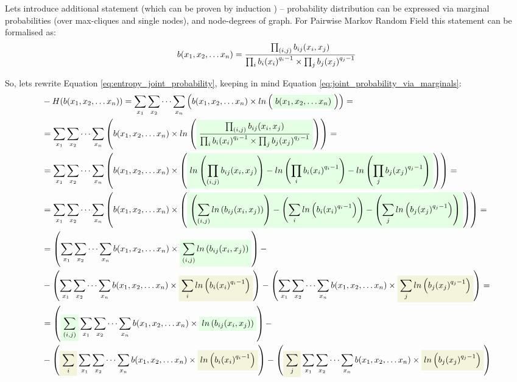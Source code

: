 \documentclass[fleqn,leqno]{article}
\newcommand{\highlight}[1]{\colorbox{green!10}{$\displaystyle#1$}}
\newcommand{\highlightred}[1]{\colorbox{olive!10}{$\displaystyle#1$}}
\begin{document}
Lets introduce additional statement \cite{bethe_free_energy_kikuch_approximations_and_bp} (which can be proven by induction \cite{a_montanari_inference_in_graphical_models}) -- probability distribution can be expressed via marginal probabilities (over max-cliques and single nodes), and node-degrees of graph. For Pairwise Markov Random Field this statement can be formalised as:
\begin{equation} \label{eq:joint_probability_via_marginals}
b(x_1, x_2, \dots x_n) = {\prod_{(i, j)} b_{ij}(x_i, x_j) \over \prod_i {b_i(x_i)}^{q_i - 1} \times \prod_j {b_j(x_j)}^{q_j - 1}}
\end{equation}

So, lets rewrite Equation \eqref{eq:entropy_joint_probability}, keeping in mind Equation \eqref{eq:joint_probability_via_marginals}:
\begin{equation}
\begin{split}
  & -H(b(x_1,x_2,\dots x_n)) = \sum_{x_1} \sum_{x_2} \cdots \sum_{x_n} \left( b(x_1, x_2, \dots x_n) \times ln \left( \highlight{b(x_1, x_2, \dots x_n)} \right) \right) = \\
  & = \sum_{x_1} \sum_{x_2} \cdots \sum_{x_n} \left( b(x_1, x_2, \dots x_n) \times ln \left( \highlight{{\prod_{(i, j)} b_{ij}(x_i, x_j) \over \prod_i {b_i(x_i)}^{q_i - 1} \times \prod_j {b_j(x_j)}^{q_j - 1}}} \right) \right) = \\
  & = \sum_{x_1} \sum_{x_2} \cdots \sum_{x_n} \left( b(x_1, x_2, \dots x_n) \times \left( \highlight{ ln \left( \prod_{(i, j)} b_{ij}(x_i, x_j) \right) - ln \left( \prod_i {b_i(x_i)}^{q_i - 1} \right) - ln \left( \prod_j {b_j(x_j)}^{q_j - 1} \right)} \right) \right) = \\
  & = \sum_{x_1} \sum_{x_2} \cdots \sum_{x_n} \left( b(x_1, x_2, \dots x_n) \times \left( \highlight{ \left( \sum_{(i, j)} ln \left( b_{ij}(x_i, x_j) \right) \right) - \left( \sum_i ln \left({b_i(x_i)}^{q_i - 1}\right) \right) - \left( \sum_j ln \left({b_j(x_j)}^{q_j - 1}\right) \right)} \right) \right) = \\
  & = \left( \sum_{x_1} \sum_{x_2} \cdots \sum_{x_n} b(x_1, x_2, \dots x_n) \times \highlight{\sum_{(i, j)} ln \left( b_{ij}(x_i, x_j) \right)} \right) - \\
  & -\left( \sum_{x_1} \sum_{x_2} \cdots \sum_{x_n} b(x_1, x_2, \dots x_n) \times \highlightred{\sum_i ln \left({b_i(x_i)}^{q_i - 1}\right)} \right) - \left( \sum_{x_1} \sum_{x_2} \cdots \sum_{x_n} b(x_1, x_2, \dots x_n) \times \highlightred{\sum_j ln \left({b_j(x_j)}^{q_j - 1}\right)} \right) = \\
  & = \left( \highlight{\sum_{(i, j)}} \sum_{x_1} \sum_{x_2} \cdots \sum_{x_n} b(x_1, x_2, \dots x_n) \times \highlight{ln \left( b_{ij}(x_i, x_j) \right)} \right) - \\
  & -\left( \highlightred{\sum_i} \sum_{x_1} \sum_{x_2} \cdots \sum_{x_n} b(x_1, x_2, \dots x_n) \times \highlightred{ln \left({b_i(x_i)}^{q_i - 1}\right)} \right) - \left( \highlightred{\sum_j} \sum_{x_1} \sum_{x_2} \cdots \sum_{x_n} b(x_1, x_2, \dots x_n) \times \highlightred{ln \left({b_j(x_j)}^{q_j - 1}\right)} \right)
\end{split}
\end{equation}
\end{document}
